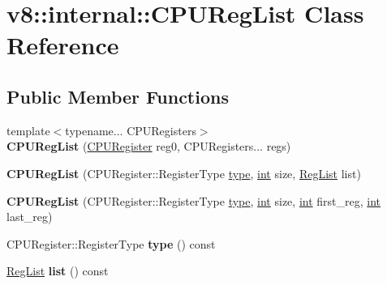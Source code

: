 \hypertarget{classv8_1_1internal_1_1CPURegList}{}\section{v8\+:\+:internal\+:\+:C\+P\+U\+Reg\+List Class Reference}
\label{classv8_1_1internal_1_1CPURegList}
\subsection*{Public Member Functions}
\begin{DoxyCompactItemize}
\item 
\mbox{\label{classv8_1_1internal_1_1CPURegList_ab8aff1444a4773c459869b33fe60479a}} 
{\footnotesize template$<$typename... C\+P\+U\+Registers$>$ }\\{\bfseries C\+P\+U\+Reg\+List} (\mbox{\hyperlink{classv8_1_1internal_1_1CPURegister}{C\+P\+U\+Register}} reg0, C\+P\+U\+Registers... regs)
\item 
\mbox{\label{classv8_1_1internal_1_1CPURegList_a31ee71710ba6ff07cb8d70cf0efede07}} 
{\bfseries C\+P\+U\+Reg\+List} (C\+P\+U\+Register\+::\+Register\+Type \mbox{\hyperlink{classstd_1_1conditional_1_1type}{type}}, \mbox{\hyperlink{classint}{int}} size, \mbox{\hyperlink{classuint32__t}{Reg\+List}} list)
\item 
\mbox{\label{classv8_1_1internal_1_1CPURegList_a49055381096146c65ff6e11786b56067}} 
{\bfseries C\+P\+U\+Reg\+List} (C\+P\+U\+Register\+::\+Register\+Type \mbox{\hyperlink{classstd_1_1conditional_1_1type}{type}}, \mbox{\hyperlink{classint}{int}} size, \mbox{\hyperlink{classint}{int}} first\+\_\+reg, \mbox{\hyperlink{classint}{int}} last\+\_\+reg)
\item 
\mbox{\label{classv8_1_1internal_1_1CPURegList_a54a5d7c1e76c61b75c4380420f38a145}} 
C\+P\+U\+Register\+::\+Register\+Type {\bfseries type} () const
\item 
\mbox{\label{classv8_1_1internal_1_1CPURegList_a0d1fc8e714f9efde6323dddaf733d760}} 
\mbox{\hyperlink{classuint32__t}{Reg\+List}} {\bfseries list} () const
\item 

\end{DoxyCompactItemize}
